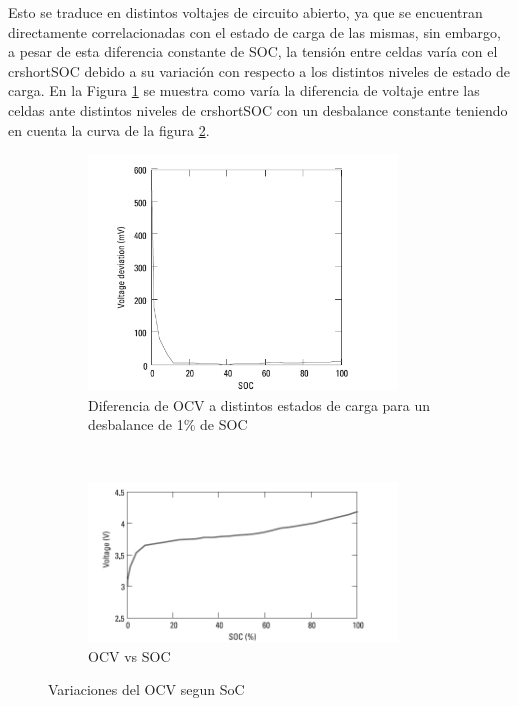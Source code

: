 \documentclass[10pt,a4paper]{article}
\begin{document}
    Esto se traduce en distintos voltajes de circuito abierto, ya que se encuentran directamente correlacionadas con el estado de carga de las mismas, sin embargo, a pesar de esta diferencia constante de \acrshort{SOC}, la tensión entre celdas varía con el crshort{SOC} debido a su variación con respecto a los distintos niveles de estado de carga. En la Figura \ref{diff_imbalance} se muestra como varía la diferencia de voltaje entre las celdas ante distintos niveles de crshort{SOC} con un desbalance constante teniendo en cuenta la curva de la figura \ref{OCV_SOC_equalization_figure}.
	
	\begin{figure}[h!]
            \begin{subfigure}[t]{.5\textwidth}
            \begin{center}
                \includegraphics[width=0.9\textwidth]{diff_imbalance.png}
                \caption{Diferencia de OCV a distintos estados de carga para un desbalance de 1\% de SOC}
                \label{diff_imbalance}
            \end{center}
        \end{subfigure}%
            ~
    	\begin{subfigure}[t]{.5\textwidth}
    		\begin{center}
    			\includegraphics[width=0.9\textwidth]{SOC_vs_OCV_equalization.png}
    			\caption{OCV vs SOC}
    			\label{OCV_SOC_equalization_figure}
    		\end{center}
    	\end{subfigure}
        \caption{Variaciones del OCV segun SoC}
        \label{rep_OCV_SOC}
    \end{figure}
	\FloatBarrier
\end{document}

